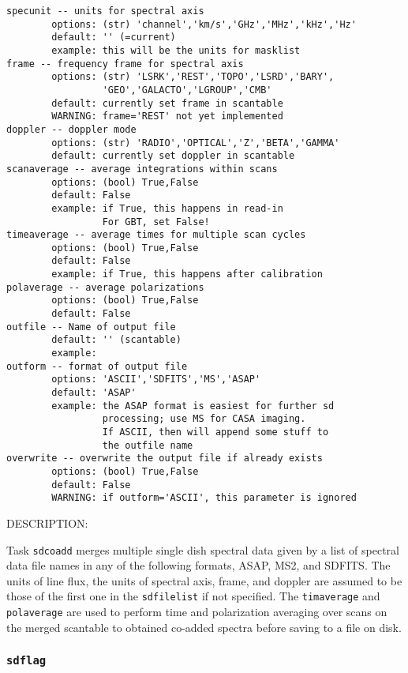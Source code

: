 \begin{verbatim}
specunit -- units for spectral axis
        options: (str) 'channel','km/s','GHz','MHz','kHz','Hz'
        default: '' (=current)
        example: this will be the units for masklist
frame -- frequency frame for spectral axis
        options: (str) 'LSRK','REST','TOPO','LSRD','BARY',
                 'GEO','GALACTO','LGROUP','CMB'
        default: currently set frame in scantable
        WARNING: frame='REST' not yet implemented
doppler -- doppler mode
        options: (str) 'RADIO','OPTICAL','Z','BETA','GAMMA'
        default: currently set doppler in scantable
scanaverage -- average integrations within scans
        options: (bool) True,False
        default: False
        example: if True, this happens in read-in
                 For GBT, set False!
timeaverage -- average times for multiple scan cycles
        options: (bool) True,False
        default: False
        example: if True, this happens after calibration
polaverage -- average polarizations
        options: (bool) True,False
        default: False
outfile -- Name of output file
        default: '' (scantable)
        example:
outform -- format of output file
        options: 'ASCII','SDFITS','MS','ASAP'
        default: 'ASAP'
        example: the ASAP format is easiest for further sd
                 processing; use MS for CASA imaging.
                 If ASCII, then will append some stuff to
                 the outfile name
overwrite -- overwrite the output file if already exists
        options: (bool) True,False
        default: False
        WARNING: if outform='ASCII', this parameter is ignored
\end{verbatim}

          DESCRIPTION:

          Task {\tt sdcoadd} merges multiple single dish spectral data given by
          a list of spectral data file names in any of the following formats,
          ASAP, MS2, and SDFITS.
          The units of line flux, the units of spectral axis, frame, and doppler
          are assumed to be those of the first one in the {\tt sdfilelist} if not
          specified.
          The {\tt timaverage} and {\tt polaverage} are used to perform time
          and polarization averaging over scans on the merged scantable to 
          obtained co-added spectra before saving to a file on disk.


\subsubsection{{\tt sdflag}}
\label{section:sd.sdtasks.tasks.sdflag}

